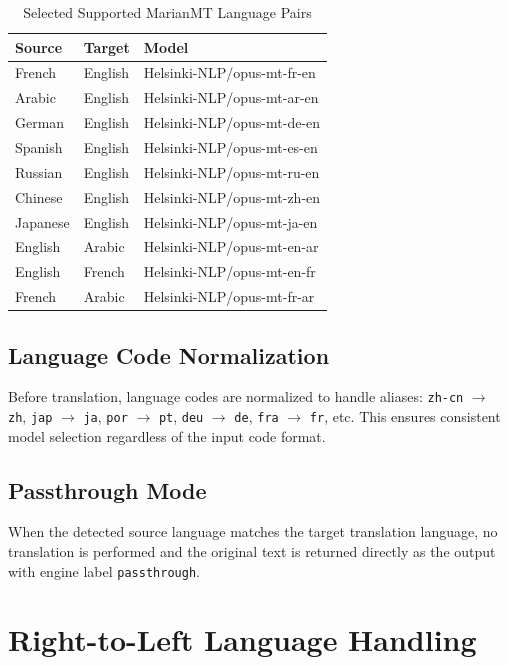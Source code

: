 \documentclass[12pt]{report}
\begin{document}
\begin{table}[H]
\centering
\begin{tabular}{|l|l|l|}
\hline
\textbf{Source} & \textbf{Target} & \textbf{Model} \\
\hline
French & English & Helsinki-NLP/opus-mt-fr-en \\
\hline
Arabic & English & Helsinki-NLP/opus-mt-ar-en \\
\hline
German & English & Helsinki-NLP/opus-mt-de-en \\
\hline
Spanish & English & Helsinki-NLP/opus-mt-es-en \\
\hline
Russian & English & Helsinki-NLP/opus-mt-ru-en \\
\hline
Chinese & English & Helsinki-NLP/opus-mt-zh-en \\
\hline
Japanese & English & Helsinki-NLP/opus-mt-ja-en \\
\hline
English & Arabic & Helsinki-NLP/opus-mt-en-ar \\
\hline
English & French & Helsinki-NLP/opus-mt-en-fr \\
\hline
French & Arabic & Helsinki-NLP/opus-mt-fr-ar \\
\hline
\end{tabular}
\caption{Selected Supported MarianMT Language Pairs}
\label{tab:marian_pairs}
\end{table}

\subsection{Language Code Normalization}
Before translation, language codes are normalized to handle aliases: \texttt{zh-cn} $\rightarrow$ \texttt{zh}, \texttt{jap} $\rightarrow$ \texttt{ja}, \texttt{por} $\rightarrow$ \texttt{pt}, \texttt{deu} $\rightarrow$ \texttt{de}, \texttt{fra} $\rightarrow$ \texttt{fr}, etc. This ensures consistent model selection regardless of the input code format.

\subsection{Passthrough Mode}
When the detected source language matches the target translation language, no translation is performed and the original text is returned directly as the output with engine label \texttt{passthrough}.

\section{Right-to-Left Language Handling}
\end{document}
